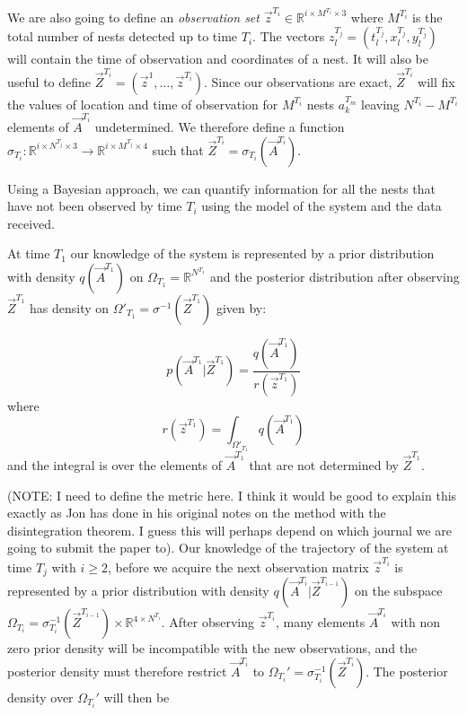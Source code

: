 {We are also going to define an \textit{observation set} $\vec{z}^{T_i} \in \mathbb{R}^{i \times M^{T_i} \times 3}$ where $M^{T_i}$ is the total number of nests detected up to time $T_i$. The vectors $z^{T_j}_l = (t^{T_j}_l, x^{T_j}_l, y^{T_j}_l)$ will contain the time of observation and coordinates of a nest. It will also be useful to define $\vec{Z}^{T_i} = (\vec{z}^1, \dots, \vec{z}^{T_i})$. Since our observations are exact, $\vec{Z}^{T_i}$ will fix the values of location and time of observation for $M^{T_i}$ nests $a^{T_m}_k$ leaving $N^{T_i}-M^{T_i}$ elements of $\vec{A}^{T_i}$ undetermined. We therefore define a function $\sigma_{T_i}: \mathbb{R}^{i\times N^{T_j}\times 3} \rightarrow \mathbb{R}^{i\times M^{T_j}\times 4}$ such that $\vec{Z}^{T_i} = \sigma_{T_i}(\vec{A}^{T_i})$.

Using a Bayesian approach, we can quantify information for all the nests that have not been observed by time $T_i$ using the model of the system and the data received.

At time $T_1$ our knowledge of the system is represented by a prior distribution with density $q(\vec{A}^{T_1})$ on $\Omega_{T_1} = \mathbb{R}^{N^{T_1}}$ and the posterior distribution after observing $\vec{Z}^{T_1}$ has density on $\Omega'_{T_1} = \sigma^{-1}(\vec{Z}^{T_1})$ given by:

\begin{equation*}
    p(\vec{A}^{T_1} | \vec{Z}^{T_1}) = \frac{q(\vec{A}^{T_1})}{r(\vec{z}^{T_1})}
\end{equation*}
where
\begin{equation*}
    r(\vec{z}^{T_1}) = \int_{\Omega'_{T_1}} q(\vec{A}^{T_1}) 
\end{equation*}
and the integral is over the elements of $\vec{A}^{T_1}$ that are not determined by $\vec{Z}^{T_1}$.

(NOTE: I need to define the metric here. I think it would be good to explain this exactly as Jon has done in his original notes on the method with the disintegration theorem. I guess this will perhaps depend on which journal we are going to submit the paper to).
Our knowledge of the trajectory of the system at time $T_j$ with $i \geq 2$, before we acquire the next observation matrix $\vec{z}^{T_i}$ is represented by a prior distribution with density $q(\vec{A}^{T_i} | \vec{Z}^{T_{i-1}})$ on the subspace $\Omega_{T_i} = \sigma_{T_i}^{-1} (\vec{Z}^{T_{i-1}}) \times \mathbb{R}^{4 \times N^{T_i}}$. After observing $\vec{z}^{T_i}$, many elements $\vec{A}^{T_i}$ with non zero prior density will be incompatible with the new observations, and the posterior density must therefore restrict $\vec{A}^{T_i}$ to $\Omega_{T_i}' = \sigma_{T_i}^{-1}(\vec{Z}^{T_i})$. The posterior density over $\Omega_{T_i}'$ will then be

}
